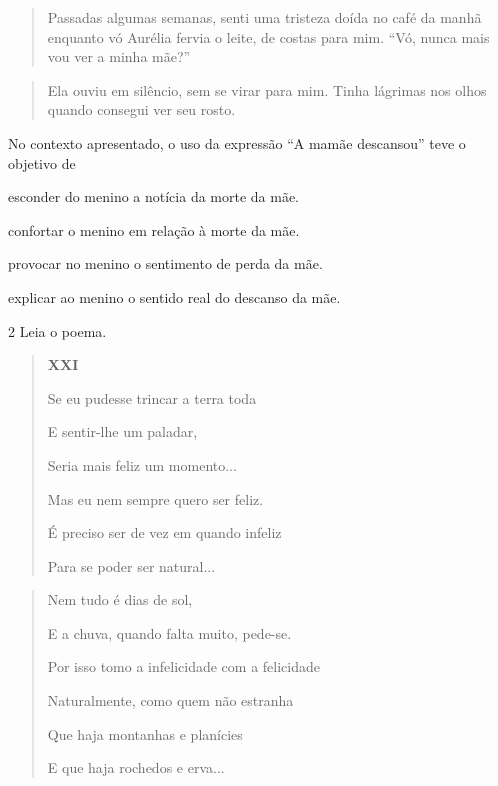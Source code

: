 \begin{quote}
Passadas algumas semanas, senti uma tristeza doída no café da manhã
enquanto vó Aurélia fervia o leite, de costas para mim. ``Vó, nunca mais
vou ver a minha mãe?''
\end{quote}

\begin{quote}
Ela ouviu em silêncio, sem se virar para mim. Tinha lágrimas nos olhos
quando consegui ver seu rosto.
\end{quote}


No contexto apresentado, o uso da expressão ``A mamãe descansou'' teve o
objetivo de

\begin{escolha}
\item esconder do menino a notícia da morte da mãe.

\item confortar o menino em relação à morte da mãe.

\item provocar no menino o sentimento de perda da mãe.

\item explicar ao menino o sentido real do descanso da mãe.
\end{escolha}

\num{2} Leia o poema.

\begin{quote}
\textbf{XXI}

Se eu pudesse trincar a terra toda

E sentir-lhe um paladar,

Seria mais feliz um momento...

Mas eu nem sempre quero ser feliz.

É preciso ser de vez em quando infeliz

Para se poder ser natural...
\end{quote}

\begin{quote}
Nem tudo é dias de sol,

E a chuva, quando falta muito, pede-se.

Por isso tomo a infelicidade com a felicidade

Naturalmente, como quem não estranha

Que haja montanhas e planícies

E que haja rochedos e erva...
\end{quote}

